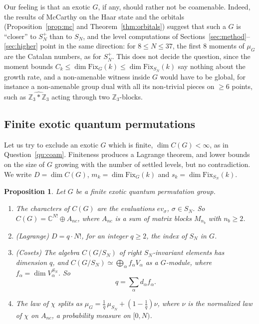 \documentclass[11pt]{amsart}
\newtheorem{proposition}[theorem]{Proposition}
\theoremstyle{definition}
\theoremstyle{remark}
\theoremstyle{plain}
\numberwithin{equation}{section}
\numberwithin{table}{section}
\newcommand{\C}{\mathbb C}
\newcommand{\Z}{\mathbb Z}
\newcommand{\Fix}{\mathrm{Fix}}
\begin{document}
Our feeling is that an exotic $G$, if any, should rather not be coamenable. Indeed, the results of McCarthy on the Haar state and the orbitals (Proposition~\ref{prop:mc} and Theorem~\ref{thm:orbitals}) suggest that such a $G$ is ``closer'' to $S_N^+$ than to $S_N$, and the level computations of Sections~\ref{sec:method}--\ref{sec:higher} point in the same direction: for $8\le N\le37$, the first $8$ moments of $\mu_G$ are the Catalan numbers, as for $S_N^+$. This does not decide the question, since the moment bounds $C_k\le\dim\Fix_G(k)\le\dim\Fix_{S_N}(k)$ say nothing about the growth rate, and a non-amenable witness inside $G$ would have to be global, for instance a non-amenable group dual with all its non-trivial pieces on $\ge6$ points, such as $\widehat{\Z_3*\Z_3}$ acting through two $\Z_3$-blocks.

\subsection{Finite exotic quantum permutations}\label{sec:finite}

Let us try to exclude an exotic $G$ which is finite, $\dim C(G)<\infty$, as in Question~\ref{qu:coam}. Finiteness produces a Lagrange theorem, and lower bounds on the size of $G$ growing with the number of settled levels, but no contradiction. We write $D=\dim C(G)$, $m_k=\dim\Fix_G(k)$ and $s_k=\dim\Fix_{S_N}(k)$.

\begin{proposition}\label{prop:finstructure}
Let $G$ be a finite exotic quantum permutation group.
\begin{enumerate}
\item The characters of $C(G)$ are the evaluations $ev_\sigma$, $\sigma\in S_N$. So $C(G)=\C^{N!}\oplus A_{nc}$, where $A_{nc}$ is a sum of matrix blocks $M_{n_b}$ with $n_b\ge2$.
\item \emph{(Lagrange)} $D=q\cdot N!$, for an integer $q\ge2$, the index of $S_N$ in $G$.
\item \emph{(Cosets)} The algebra $C(G/S_N)$ of right $S_N$-invariant elements has dimension $q$, and $C(G/S_N)\simeq\bigoplus_\alpha f_\alpha V_\alpha$ as a $G$-module, where $f_\alpha=\dim V_\alpha^{S_N}$. So
\[
q=\sum_\alpha d_\alpha f_\alpha.
\]
\item The law of $\chi$ splits as $\mu_G=\frac1q\,\mu_{S_N}+\left(1-\frac1q\right)\nu$, where $\nu$ is the normalized law of $\chi$ on $A_{nc}$, a probability measure on $[0,N)$.
\end{enumerate}
\end{proposition}
\end{document}
